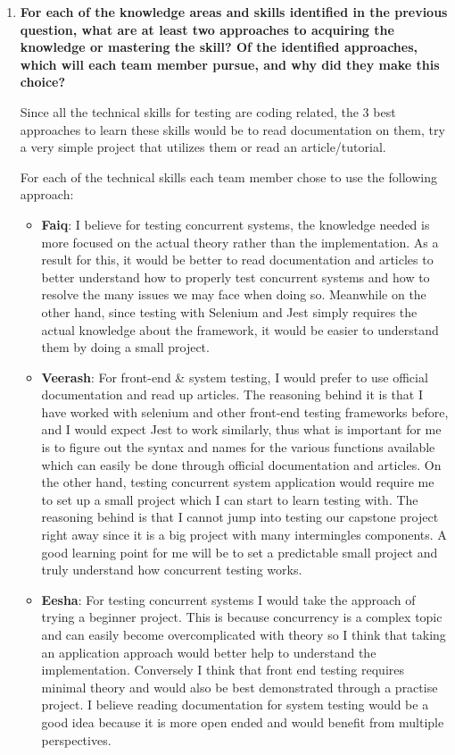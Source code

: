 \documentclass[12pt, titlepage]{article}
\begin{document}
\begin{enumerate}
		
		\item \textbf{For each of the knowledge areas and skills identified in the previous
			question, what are at least two approaches to acquiring the knowledge or
			mastering the skill?  Of the identified approaches, which will each team
			member pursue, and why did they make this choice?}
		
		Since all the technical skills for testing are coding related, the 3 best approaches to learn these skills would be to read documentation on them, try a very simple project that utilizes them or read an article/tutorial.
		
		For each of the technical skills each team member chose to use the following approach:
		
		\begin{itemize}
			\item \textbf{Faiq}: I believe for testing concurrent systems, the knowledge needed is more focused on the actual theory rather than the implementation. As a result for this, it would be better to read documentation and articles to better understand how to properly test concurrent systems and how to resolve the many issues we may face when doing so. Meanwhile on the other hand, since testing with Selenium and Jest simply requires the actual knowledge about the framework, it would be easier to understand them by doing a small project.
			
			\item \textbf{Veerash}: For front-end \& system testing, I would prefer to use official documentation and read up articles. The reasoning behind it is that I have worked with selenium and other front-end testing frameworks before, and I would expect Jest to work similarly, thus what is important for me is to figure out the syntax and names for the various functions available which can easily be done through official documentation and articles. On the other hand, testing concurrent system application would require me to set up a small project which I can start to learn testing with. The reasoning behind is that I cannot jump into testing our capstone project right away since it is a big project with many intermingles components. A good learning point for me will be to set a predictable small project and truly understand how concurrent testing works.
			
			\item \textbf{Eesha}: For testing concurrent systems I would take the approach of trying a beginner project. This is because concurrency is a complex topic and can easily become overcomplicated with theory so I think that taking an application approach would better help to understand the implementation. Conversely I think that front end testing requires minimal theory and would also be best demonstrated through a practise project. I believe reading documentation for system testing would be a good idea because it is more open ended and would benefit from multiple perspectives. 
			

\end{itemize}
\end{enumerate}
\end{document}

